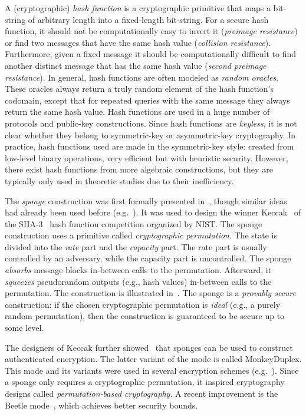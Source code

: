 A (cryptographic) \emph{hash function} is a cryptographic primitive that maps a bit-string of arbitrary length into a fixed-length bit-string. For a secure hash function, it should not be computationally easy to invert it (\emph{preimage resistance}) or find two messages that have the same hash value (\emph{collision resistance}). Furthermore, given a fixed message it should be computationally difficult to find another distinct message that has the same hash value (\emph{second preimage resistance}). In general, hash functions are often modeled as \emph{random oracles}. These oracles always return a truly random element of the hash function's codomain, except that for repeated queries with the same message they always return the same hash value. Hash functions are used in a huge number of protocols and public-key constructions. Since hash functions are \emph{keyless}, it is not clear whether they belong to symmetric-key or asymmetric-key cryptography. In practice, hash functions used are made in the symmetric-key style: created from low-level binary operations, very efficient but with heuristic security. However, there exist hash functions from more algebraic constructions, but they are typically only used in theoretic studies due to their inefficiency.

The \emph{sponge} construction was first formally presented in~\cite{sponge-ecrypt}, though similar ideas had already been used before (e.g.~\cite{LEX,RadioGatun}). It was used to design the winner Keccak~\cite{sponge-keccak} of the SHA-3~\cite{sha3} hash function competition organized by NIST. The sponge construction uses a primitive called \emph{cryptographic permutation}. The state is divided into the \emph{rate} part and the \emph{capacity} part. The rate part is usually controlled by an adversary, while the capacity part is uncontrolled. The sponge \emph{absorbs} message blocks in-between calls to the permutation. Afterward, it \emph{squeezes} pseudorandom outputs (e.g., hash values) in-between calls to the permutation. The construction is illustrated in~. The sponge is a \emph{provably secure} construction: if the chosen cryptographic permutation is \emph{ideal} (e.g., a purely random permutation), then the construction is guaranteed to be secure up to some level.


The designers of Keccak further showed~\cite{sponge-duplex,sponge-monkey} that sponges can be used to construct authenticated encryption. The latter variant of the mode is called MonkeyDuplex. This mode and its variants were used in several encryption schemes (e.g.~\cite{NORX,Ketje,ASCON}). Since a sponge only requires a cryptographic permutation, it inspired cryptography designs called \emph{permutation-based cryptography}. A recent improvement is the Beetle mode~\cite{beetle}, which achieves better security bounds.

